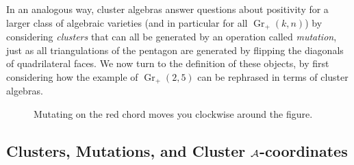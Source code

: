 \documentclass[11pt]{article}
\DeclareMathOperator{\Gr}{Gr}
\def\drawLabeledPentagon{
\coordinate (P1) at (90:1);
\coordinate (P2) at (18:1);
\coordinate (P3) at (306:1);
\coordinate (P4) at (234:1);
\coordinate (P5) at (162:1);
\draw[white,fill=white] (0,0) circle (1cm);
\draw (P1) -- (P2) -- (P3) -- (P4) -- (P5) -- cycle;
\draw (0,1.2) node {1};
\draw (.9,.3) node[anchor=west] {2};
\draw (.5,-.9) node[anchor=west] {3};
\draw (-.5,-.9) node[anchor=east] {4};
\draw (-.9,.3) node[anchor=east] {5};
}
\begin{document}
In an analogous way, cluster algebras answer questions about positivity for a larger class of algebraic varieties (and in particular for all $\Gr_+(k,n)$) by considering {\it clusters} that can all be generated by an operation called {\it mutation}, just as all triangulations of the pentagon are generated by flipping the diagonals of quadrilateral faces. We now turn to the definition of these objects, by first considering how the example of $\Gr_+(2,5)$ can be rephrased in terms of cluster algebras.

\begin{figure}[t]   \centering
  \caption{Mutating on the red chord moves you clockwise around the figure.}
\label{fig:pent_triangulations}
\end{figure}


\subsection{Clusters, Mutations, and Cluster ${\cal A}$-coordinates}
\end{document}
